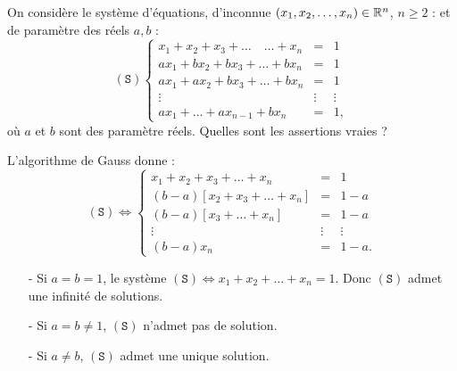 \begin{question}
On considère le système d'équations, d'inconnue $(x_1,x_2,\dots,x_n) \in \mathbb{R}^n$, $n \ge 2$ : et de paramètre des réels  $a,b$ :
$$(\mathtt{S})  
\left\{\begin{array}{ccc}
x_1+x_2 + x_3+\dots \quad \dots+ x_n&=&1\\
ax_1+bx_2 + bx_3 +  \dots   +bx_n&=&1\\
ax_1+ax_2+bx_3 + \dots +bx_n&=&1\\ \vdots &\vdots&\vdots\\
ax_1+\dots + ax_{n-1}+bx_n&=&1,\end{array}\right.$$
où $a$ et $b$ sont des paramètre réels. Quelles sont les assertions vraies ?
\begin{answers}  
\end{answers}
\begin{explanations} L'algorithme de Gauss donne :
$$(\mathtt{S}) \Leftrightarrow  
\left\{\begin{array}{rcc}
x_1+x_2+x_3+\dots+ x_n&=&1\\
(b-a)[x_2+x_3+\dots+ x_n]&=&1-a\\
(b-a)[x_3+\dots +x_n]&=&1-a\\
\vdots &\vdots&\vdots\\
(b-a)x_n&=&1-a.
\end{array}\right.$$
\begin{enumerate}
\item[-] Si $a=b=1$, le système $(\mathtt{S})\Leftrightarrow x_1+x_2+\dots+ x_n=1$. Donc $(\mathtt{S})$ admet une infinité de solutions.
\item[-] Si $a=b \neq 1$, $(\mathtt{S})$ n'admet pas de solution.
\item[-] Si $a\neq b$, $(\mathtt{S})$ admet une unique  solution.
\end{enumerate}
\end{explanations}
\end{question}

